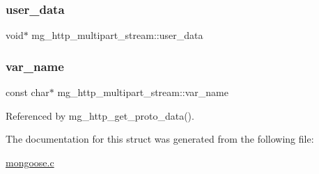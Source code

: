 \subsubsection{\texorpdfstring{user\+\_\+data}{user\_data}}
{\footnotesize\ttfamily void$\ast$ mg\+\_\+http\+\_\+multipart\+\_\+stream\+::user\+\_\+data}

\mbox{\label{structmg__http__multipart__stream_a4fd8fc13c41018970fc693e67c785581_a4fd8fc13c41018970fc693e67c785581}} 
\subsubsection{\texorpdfstring{var\+\_\+name}{var\_name}}
{\footnotesize\ttfamily const char$\ast$ mg\+\_\+http\+\_\+multipart\+\_\+stream\+::var\+\_\+name}



Referenced by mg\+\_\+http\+\_\+get\+\_\+proto\+\_\+data().



The documentation for this struct was generated from the following file\+:\begin{DoxyCompactItemize}
\item 
\hyperlink{mongoose_8c}{mongoose.\+c}\end{DoxyCompactItemize}
